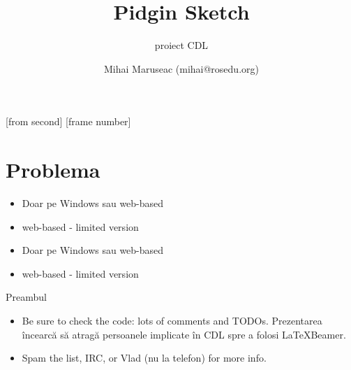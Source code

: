 \documentclass{beamer}
\title[Pidgin]{Pidgin Sketch}
\subtitle{proiect CDL}
\institute[ROSEdu]{ROSEdu}
\author[MM]{Mihai Maruseac (mihai@rosedu.org)}
\begin{document}
[from second]
[frame number]

\frame{\titlepage}

\begin{frame}
\tableofcontents
\end{frame}

\section{Problema}


\begin{frame}[label=c]
  \begin{center}
    \vskip2cm
    \begin{itemize}
      \item Doar pe Windows sau web-based
      \item web-based - limited version
    \end{itemize}
  \end{center}
\end{frame}

\begin{frame}[label=c]
  \begin{center}
    \vskip2cm
    \begin{itemize}
      \item Doar pe Windows sau web-based
      \item web-based - limited version
    \end{itemize}
  \end{center}
\end{frame}

\begin{frame}{Preambul}
  \begin{itemize} %
  \item Be sure to check the code: lots of comments and TODOs.
  \alert{Prezentarea încearcă să atragă persoanele implicate în CDL spre a folosi
    \LaTeX Beamer.}
  \item Spam the list, IRC, or Vlad (nu la telefon) for more info.
  \end{itemize}
\end{frame}
\end{document}
